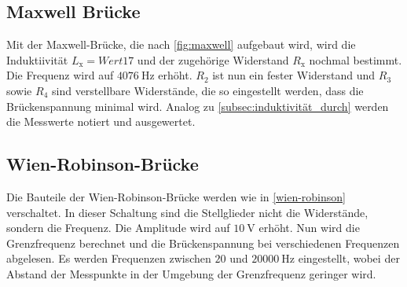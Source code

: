 \subsection{Maxwell Brücke}
\label{subsec:maxwell_durch}
Mit der Maxwell-Brücke, die nach \autoref{fig:maxwell} aufgebaut wird, wird die Induktiivität $L_{\text{x}}=Wert 17$ und der zugehörige Widerstand $R_{\text{x}}$ nochmal bestimmt.
Die Frequenz wird auf $\qty{4076}{\hertz}$ erhöht. 
$R_2$ ist nun ein fester Widerstand und $R_3$ sowie $R_4$ sind verstellbare Widerstände, die so eingestellt werden, dass die Brückenspannung minimal wird.
Analog zu \autoref{subsec:induktivität_durch} werden die Messwerte notiert und ausgewertet.

\subsection{Wien-Robinson-Brücke}
\label{subsec:wien-robinson_durch}
Die Bauteile der Wien-Robinson-Brücke werden wie in \autoref{wien-robinson} verschaltet.
In dieser Schaltung sind die Stellglieder nicht die Widerstände, sondern die Frequenz.
Die Amplitude wird auf $\qty{10}{\volt}$ erhöht.
Nun wird die Grenzfrequenz berechnet und die Brückenspannung bei verschiedenen Frequenzen abgelesen.
Es werden Frequenzen zwischen $20$ und $\qty{20000}{\hertz}$ eingestellt, wobei der Abstand der Messpunkte in der Umgebung der Grenzfrequenz geringer wird.